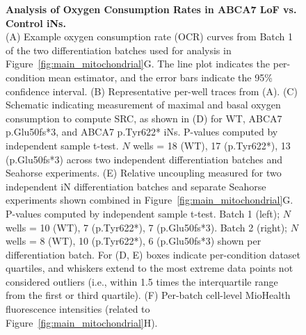\begin{figure}[ht]
    \centering
    \caption{
        \textbf{Analysis of Oxygen Consumption Rates in ABCA7 LoF vs. Control iNs.}\\[1ex]
        (A) Example oxygen consumption rate (OCR) curves from Batch 1 of the two differentiation batches used for analysis in Figure~\ref{fig:main_mitochondrial}G. The line plot indicates the per-condition mean estimator, and the error bars indicate the 95\% confidence interval. 
        (B) Representative per-well traces from (A). 
        (C) Schematic indicating measurement of maximal and basal oxygen consumption to compute SRC, as shown in 
        (D) for WT, ABCA7 p.Glu50fs*3, and ABCA7 p.Tyr622* iNs. P-values computed by independent sample t-test. $N$ wells = 18 (WT), 17 (p.Tyr622*), 13 (p.Glu50fs*3) across two independent differentiation batches and Seahorse experiments. 
        (E) Relative uncoupling measured for two independent iN differentiation batches and separate Seahorse experiments shown combined in Figure~\ref{fig:main_mitochondrial}G. P-values computed by independent sample t-test. Batch 1 (left); $N$ wells = 10 (WT), 7 (p.Tyr622*), 7 (p.Glu50fs*3). Batch 2 (right); $N$ wells = 8 (WT), 10 (p.Tyr622*), 6 (p.Glu50fs*3) shown per differentiation batch. For (D, E) boxes indicate per-condition dataset quartiles, and whiskers extend to the most extreme data points not considered outliers (i.e., within 1.5 times the interquartile range from the first or third quartile). 
        (F) Per-batch cell-level MioHealth fluorescence intensities (related to Figure~\ref{fig:main_mitochondrial}H).
    }
    \label{fig:oxygen_consumption_rates_iPSC_neurons}
\end{figure}

